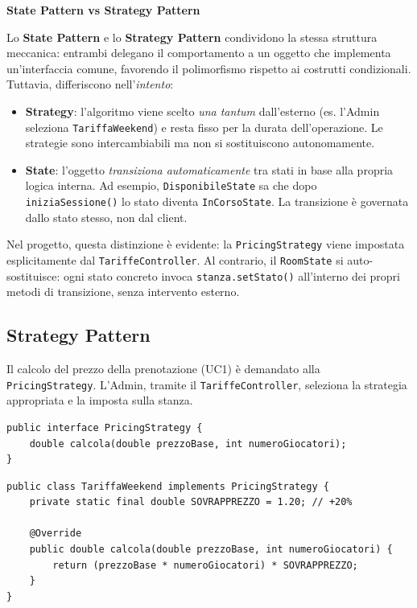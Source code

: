 \begin{approfondimento}
\textbf{State Pattern vs Strategy Pattern}

Lo \textbf{State Pattern} e lo \textbf{Strategy Pattern} condividono la stessa struttura meccanica: entrambi delegano il comportamento a un oggetto che implementa un'interfaccia comune, favorendo il polimorfismo rispetto ai costrutti condizionali. Tuttavia, differiscono nell'\textit{intento}:
\begin{itemize}
    \item \textbf{Strategy}: l'algoritmo viene scelto \textit{una tantum} dall'esterno (es. l'Admin seleziona \texttt{TariffaWeekend}) e resta fisso per la durata dell'operazione. Le strategie sono intercambiabili ma non si sostituiscono autonomamente.
    \item \textbf{State}: l'oggetto \textit{transiziona automaticamente} tra stati in base alla propria logica interna. Ad esempio, \texttt{DisponibileState} sa che dopo \texttt{iniziaSessione()} lo stato diventa \texttt{InCorsoState}. La transizione è governata dallo stato stesso, non dal client.
\end{itemize}
Nel progetto, questa distinzione è evidente: la \texttt{PricingStrategy} viene impostata esplicitamente dal \texttt{TariffeController}. Al contrario, il \texttt{RoomState} si auto-sostituisce: ogni stato concreto invoca \texttt{stanza.setStato()} all'interno dei propri metodi di transizione, senza intervento esterno.
\end{approfondimento}

\subsection{Strategy Pattern}
Il calcolo del prezzo della prenotazione (UC1) è demandato alla \texttt{PricingStrategy}. L'Admin, tramite il \texttt{TariffeController}, seleziona la strategia appropriata e la imposta sulla stanza.

\begin{lstlisting}[caption={Interfaccia dello Strategy Pattern (\texttt{PricingStrategy.java})}, label={lst:strategy_interface}]
public interface PricingStrategy {
    double calcola(double prezzoBase, int numeroGiocatori);
}
\end{lstlisting}

\begin{lstlisting}[caption={Strategia concreta (\texttt{TariffaWeekend.java})}, label={lst:strategy_concrete}]
public class TariffaWeekend implements PricingStrategy {
    private static final double SOVRAPPREZZO = 1.20; // +20%
    
    @Override
    public double calcola(double prezzoBase, int numeroGiocatori) {
        return (prezzoBase * numeroGiocatori) * SOVRAPPREZZO;
    }
}
\end{lstlisting}

